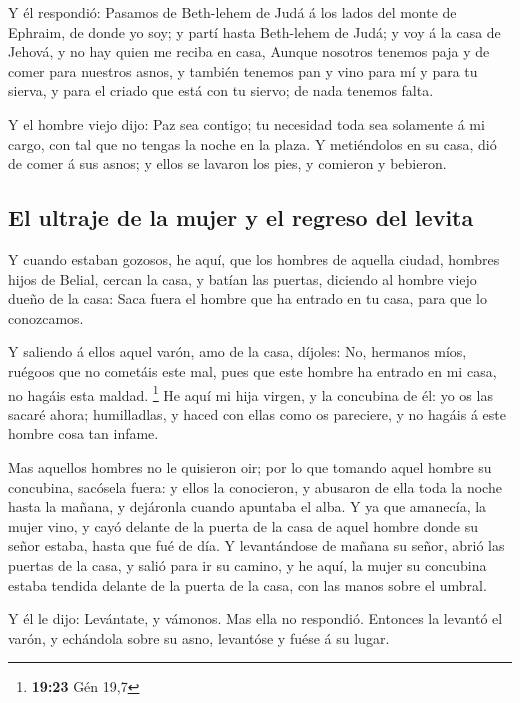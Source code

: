  Y él respondió: Pasamos de Beth-lehem de Judá á los lados
del monte de Ephraim, de donde yo soy; y partí hasta Beth-lehem de Judá;
y voy á la casa de Jehová, y no hay quien me reciba en casa,
 Aunque nosotros tenemos paja y de comer para nuestros
asnos, y también tenemos pan y vino para mí y para tu sierva, y para el
criado que está con tu siervo; de nada tenemos falta.

 Y el hombre viejo dijo: Paz sea contigo; tu necesidad toda
sea solamente á mi cargo, con tal que no tengas la noche en la plaza.
 Y metiéndolos en su casa, dió de comer á sus asnos; y
ellos se lavaron los pies, y comieron y bebieron.

\hypertarget{el-ultraje-de-la-mujer-y-el-regreso-del-levita}{%
\subsection{El ultraje de la mujer y el regreso del
levita}\label{el-ultraje-de-la-mujer-y-el-regreso-del-levita}}

 Y cuando estaban gozosos, he aquí, que los hombres de
aquella ciudad, hombres hijos de Belial, cercan la casa, y batían las
puertas, diciendo al hombre viejo dueño de la casa: Saca fuera el hombre
que ha entrado en tu casa, para que lo conozcamos.

 Y saliendo á ellos aquel varón, amo de la casa, díjoles:
No, hermanos míos, ruégoos que no cometáis este mal, pues que este
hombre ha entrado en mi casa, no hagáis esta maldad. \footnote{\textbf{19:23}
  Gén 19,7}  He aquí mi hija virgen, y la concubina de él:
yo os las sacaré ahora; humilladlas, y haced con ellas como os
pareciere, y no hagáis á este hombre cosa tan infame.

 Mas aquellos hombres no le quisieron oir; por lo que
tomando aquel hombre su concubina, sacósela fuera: y ellos la
conocieron, y abusaron de ella toda la noche hasta la mañana, y
dejáronla cuando apuntaba el alba.  Y ya que amanecía, la
mujer vino, y cayó delante de la puerta de la casa de aquel hombre donde
su señor estaba, hasta que fué de día.  Y levantándose de
mañana su señor, abrió las puertas de la casa, y salió para ir su
camino, y he aquí, la mujer su concubina estaba tendida delante de la
puerta de la casa, con las manos sobre el umbral.

 Y él le dijo: Levántate, y vámonos. Mas ella no respondió.
Entonces la levantó el varón, y echándola sobre su asno, levantóse y
fuése á su lugar.

